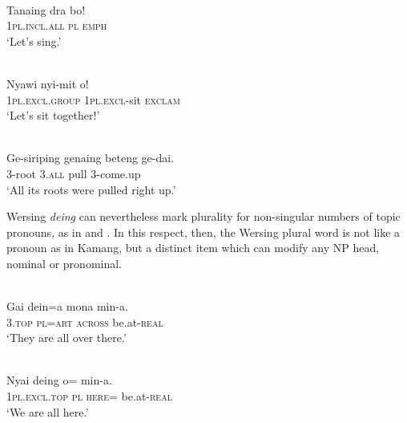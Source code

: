 \ea%
\label{ex:9:58}
 \\
\gll  Tanaing dra bo! \\
   \textsc{1pl.incl.all} \textsc{pl}   \textsc{emph}  \\
\glt `Let's sing.'
\z







\ea%
\label{ex:9:59}
 \\
\gll  Nyawi nyi-mit o! \\
   \textsc{1pl.excl.}\textsc{group} \textsc{1pl.excl}-sit \textsc{exclam}  \\
\glt `Let's sit together!'
\z







\ea%
\label{ex:9:60}
 \\
\gll  Ge-siriping genaing beteng ge-dai. \\
 \textsc{3-}root \textsc{3.all}   pull 3-come.up    \\
\glt `All its roots were pulled right up.'
\z





Wersing \textit{d}\textit{eing} can nevertheless mark plurality for non-singular numbers of topic pronouns, as in  and . In this respect, then, the Wersing plural word is not like a pronoun as in Kamang, but a distinct item which can modify any NP head, nominal or pronominal.


\ea%
\label{ex:9:61}
 \\
\gll  Gai dein=a mona min-a. \\
   \textsc{3.top} \textsc{pl}=\textsc{art} \textsc{across} be.at-\textsc{real}  \\
\glt `They are all over there.'
\z







\ea%
\label{ex:9:62}
 \\
\gll  Nyai deing o= min-a. \\
  \textsc{1pl.excl.top} \textsc{pl}   \textsc{here=} be.at-\textsc{real}   \\
\glt `We are all here.'
\z






